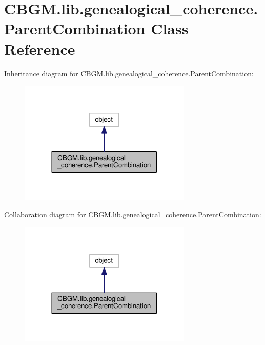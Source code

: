 \hypertarget{classCBGM_1_1lib_1_1genealogical__coherence_1_1ParentCombination}{}\section{C\+B\+G\+M.\+lib.\+genealogical\+\_\+coherence.\+Parent\+Combination Class Reference}
\label{classCBGM_1_1lib_1_1genealogical__coherence_1_1ParentCombination}


Inheritance diagram for C\+B\+G\+M.\+lib.\+genealogical\+\_\+coherence.\+Parent\+Combination\+:\nopagebreak
\begin{figure}[H]
\begin{center}
\leavevmode
\includegraphics[width=233pt]{classCBGM_1_1lib_1_1genealogical__coherence_1_1ParentCombination__inherit__graph}
\end{center}
\end{figure}


Collaboration diagram for C\+B\+G\+M.\+lib.\+genealogical\+\_\+coherence.\+Parent\+Combination\+:\nopagebreak
\begin{figure}[H]
\begin{center}
\leavevmode
\includegraphics[width=233pt]{classCBGM_1_1lib_1_1genealogical__coherence_1_1ParentCombination__coll__graph}
\end{center}
\end{figure}
